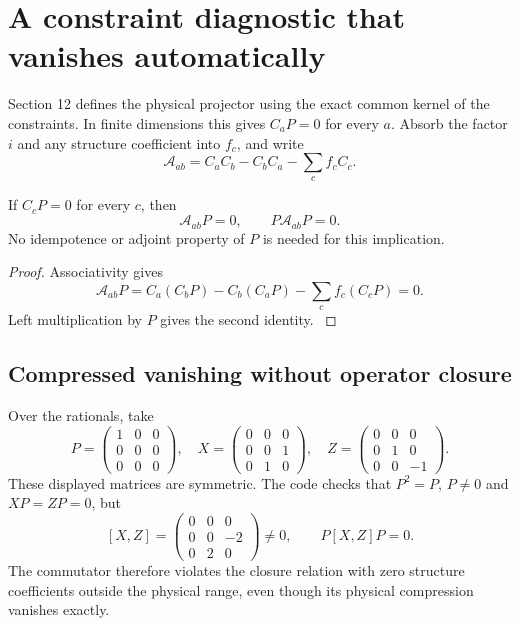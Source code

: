 \section{A constraint diagnostic that vanishes automatically}\label{supp1:section:005}
Section 12 defines the physical projector using the exact common kernel of the constraints. In finite dimensions this gives $C_aP=0$ for every $a$. Absorb the factor $i$ and any structure coefficient into $f_c$, and write
\[
\mathcal A_{ab}=C_aC_b-C_bC_a-\sum_cf_cC_c.
\]
\begin{proposition}\label{supp1:proposition:001}
If $C_cP=0$ for every $c$, then
\[
\mathcal A_{ab}P=0,\qquad P\mathcal A_{ab}P=0.
\]
No idempotence or adjoint property of $P$ is needed for this implication.
\end{proposition}
\begin{proof}\label{supp1:proof:001}
Associativity gives
\[
\mathcal A_{ab}P=C_a(C_bP)-C_b(C_aP)-\sum_cf_c(C_cP)=0.
\]
Left multiplication by $P$ gives the second identity.
\label{supp1:proof:001:end}\end{proof}

\subsection{Compressed vanishing without operator closure}
Over the rationals, take
\[
P=\begin{pmatrix}1&0&0\\0&0&0\\0&0&0\end{pmatrix},\quad
X=\begin{pmatrix}0&0&0\\0&0&1\\0&1&0\end{pmatrix},\quad
Z=\begin{pmatrix}0&0&0\\0&1&0\\0&0&-1\end{pmatrix}.
\]
These displayed matrices are symmetric. The code checks that $P^2=P$, $P\ne0$ and $XP=ZP=0$, but
\[
[X,Z]=\begin{pmatrix}0&0&0\\0&0&-2\\0&2&0\end{pmatrix}\ne0,
\qquad P[X,Z]P=0.
\]
The commutator therefore violates the closure relation with zero structure coefficients outside the physical range, even though its physical compression vanishes exactly.




